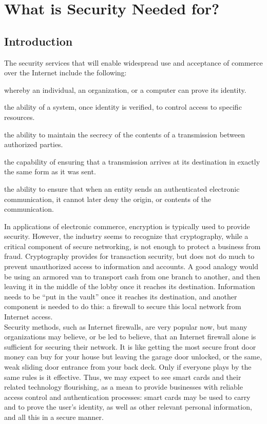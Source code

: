 \chapter{What is Security Needed for?}

\section{Introduction}
The security services that will enable widespread use and acceptance of
commerce over the Internet include the following:

\begin{htmllist}
  \item[Authentication:] whereby an individual, an organization, or a
    computer can prove its identity.
  \item[Authorization:] the ability of a system, once identity is verified,
    to control access to specific resources.
  \item[Confidentiality:] the ability to maintain the secrecy of the
    contents of a transmission between authorized parties.
  \item[Integrity:] the capability of ensuring that a transmission arrives
    at its destination in exactly the same form as it was sent.
  \item[Non-repudiation of origin:] the ability to ensure that when an
    entity sends an authenticated electronic communication, it cannot later
    deny the origin, or contents of the communication.
\end{htmllist}

In applications of electronic commerce, encryption is typically used to
provide security. However, the industry seems to recognize that
cryptography, while a critical component of secure networking, is not
enough to protect a business from fraud. Cryptography provides for
transaction security, but does not do much to prevent unauthorized
access to information and accounts. A good analogy would be using an
armored van to transport cash from one branch to another, and then
leaving it in the middle of the lobby once it reaches its destination.
Information needs to be ``put in the vault'' once it reaches its
destination, and another component is needed to do this: a firewall to
secure this local network from Internet access.\\

Security methods, such as Internet firewalls, are very popular now, but
many organizations may believe, or be led to believe, that an Internet
firewall alone is sufficient for securing their network. It is like
getting the most secure front door money can buy for your house but
leaving the garage door unlocked, or the same, weak sliding door
entrance from your back deck. Only if everyone plays by the same rules
is it effective. Thus, we may expect to see smart cards and their
related technology flourishing, as a mean to provide businesses with
reliable access control and authentication processes: smart cards may
be used to carry and to prove the user's identity, as well as other
relevant personal information, and all this in a secure manner.\\

